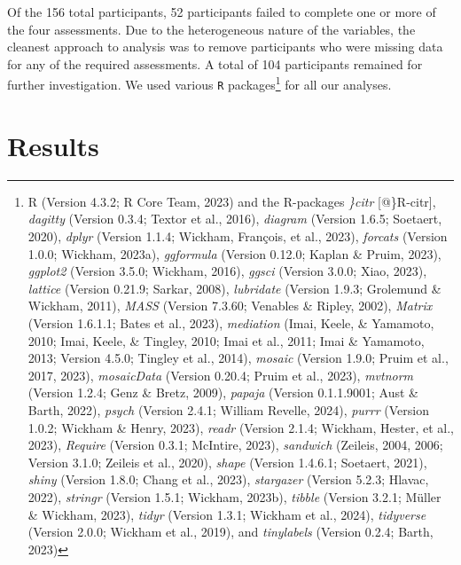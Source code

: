 \documentclass[
  man,floatsintext]{apa7}
\begin{document}
Of the 156 total participants, 52 participants failed to complete one or more of the four assessments. Due to the heterogeneous nature of the variables, the cleanest approach to analysis was to remove participants who were missing data for any of the required assessments. A total of 104 participants remained for further investigation. We used various \texttt{R} packages\footnote{R (Version 4.3.2; R Core Team, 2023) and the R-packages \emph{\}citr} {[}@\}R-citr{]}, \emph{dagitty} (Version 0.3.4; Textor et al., 2016), \emph{diagram} (Version 1.6.5; Soetaert, 2020), \emph{dplyr} (Version 1.1.4; Wickham, François, et al., 2023), \emph{forcats} (Version 1.0.0; Wickham, 2023a), \emph{ggformula} (Version 0.12.0; Kaplan \& Pruim, 2023), \emph{ggplot2} (Version 3.5.0; Wickham, 2016), \emph{ggsci} (Version 3.0.0; Xiao, 2023), \emph{lattice} (Version 0.21.9; Sarkar, 2008), \emph{lubridate} (Version 1.9.3; Grolemund \& Wickham, 2011), \emph{MASS} (Version 7.3.60; Venables \& Ripley, 2002), \emph{Matrix} (Version 1.6.1.1; Bates et al., 2023), \emph{mediation} (Imai, Keele, \& Yamamoto, 2010; Imai, Keele, \& Tingley, 2010; Imai et al., 2011; Imai \& Yamamoto, 2013; Version 4.5.0; Tingley et al., 2014), \emph{mosaic} (Version 1.9.0; Pruim et al., 2017, 2023), \emph{mosaicData} (Version 0.20.4; Pruim et al., 2023), \emph{mvtnorm} (Version 1.2.4; Genz \& Bretz, 2009), \emph{papaja} (Version 0.1.1.9001; Aust \& Barth, 2022), \emph{psych} (Version 2.4.1; William Revelle, 2024), \emph{purrr} (Version 1.0.2; Wickham \& Henry, 2023), \emph{readr} (Version 2.1.4; Wickham, Hester, et al., 2023), \emph{Require} (Version 0.3.1; McIntire, 2023), \emph{sandwich} (Zeileis, 2004, 2006; Version 3.1.0; Zeileis et al., 2020), \emph{shape} (Version 1.4.6.1; Soetaert, 2021), \emph{shiny} (Version 1.8.0; Chang et al., 2023), \emph{stargazer} (Version 5.2.3; Hlavac, 2022), \emph{stringr} (Version 1.5.1; Wickham, 2023b), \emph{tibble} (Version 3.2.1; Müller \& Wickham, 2023), \emph{tidyr} (Version 1.3.1; Wickham et al., 2024), \emph{tidyverse} (Version 2.0.0; Wickham et al., 2019), and \emph{tinylabels} (Version 0.2.4; Barth, 2023)} for all our analyses.

\hypertarget{results}{%
\section{Results}\label{results}}
\end{document}
